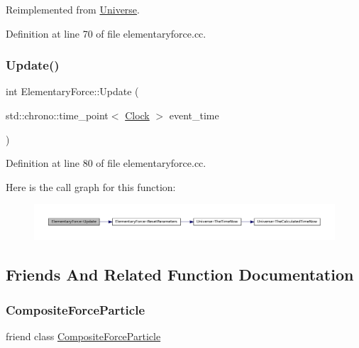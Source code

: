 Reimplemented from \mbox{\hyperlink{class_universe_a2d3d642bfdc863248e93535832fa4b00}{Universe}}.



Definition at line 70 of file elementaryforce.\+cc.

\mbox{\label{class_elementary_force_a855c26eb8a542ff633af66940da5f90b}} 
\subsubsection{\texorpdfstring{Update()}{Update()}}
{\footnotesize\ttfamily int Elementary\+Force\+::\+Update (\begin{DoxyParamCaption}\item[{std\+::chrono\+::time\+\_\+point$<$ \mbox{\hyperlink{universe_8h_a0ef8d951d1ca5ab3cfaf7ab4c7a6fd80}{Clock}} $>$}]{event\+\_\+time }\end{DoxyParamCaption})}



Definition at line 80 of file elementaryforce.\+cc.

Here is the call graph for this function\+:\nopagebreak
\begin{figure}[H]
\begin{center}
\leavevmode
\includegraphics[width=350pt]{class_elementary_force_a855c26eb8a542ff633af66940da5f90b_cgraph}
\end{center}
\end{figure}


\subsection{Friends And Related Function Documentation}
\mbox{\label{class_elementary_force_a9bc6eb2a4c20ce83728a7c9a31b91f19}} 
\subsubsection{\texorpdfstring{Composite\+Force\+Particle}{CompositeForceParticle}}
{\footnotesize\ttfamily friend class \mbox{\hyperlink{class_composite_force_particle}{Composite\+Force\+Particle}}\hspace{0.3cm}{\ttfamily [friend]}}



